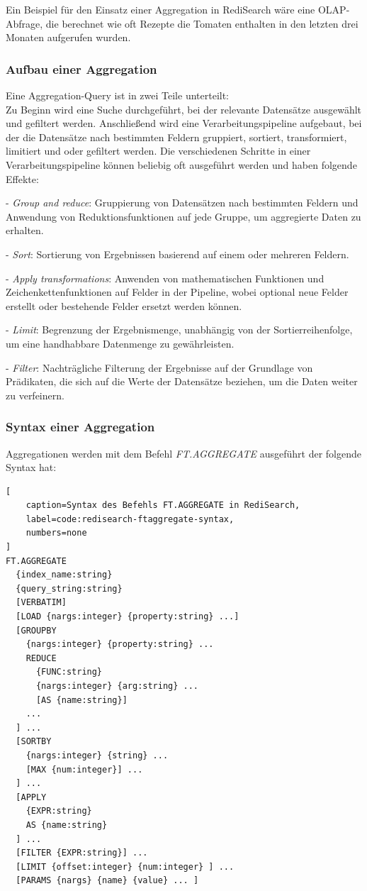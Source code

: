 Ein Beispiel für den Einsatz einer Aggregation in RediSearch wäre eine OLAP-Abfrage, die berechnet wie oft Rezepte die Tomaten enthalten in den letzten drei Monaten aufgerufen wurden.

\subsubsection{Aufbau einer Aggregation}
Eine Aggregation-Query ist in zwei Teile unterteilt:\\
Zu Beginn wird eine Suche durchgeführt, bei der relevante Datensätze ausgewählt und gefiltert werden.
Anschließend wird eine Verarbeitungspipeline aufgebaut, bei der die Datensätze nach bestimmten Feldern gruppiert, sortiert, transformiert, limitiert und oder gefiltert werden. Die verschiedenen Schritte in einer Verarbeitungspipeline können beliebig oft ausgeführt werden und haben folgende Effekte:

- \emph{Group and reduce}: Gruppierung von Datensätzen nach bestimmten Feldern und Anwendung von Reduktionsfunktionen auf jede Gruppe, um aggregierte Daten zu erhalten.
    
- \emph{Sort}: Sortierung von Ergebnissen basierend auf einem oder mehreren Feldern.
    
- \emph{Apply transformations}: Anwenden von mathematischen Funktionen und Zeichenkettenfunktionen auf Felder in der Pipeline, wobei optional neue Felder erstellt oder bestehende Felder ersetzt werden können.
    
- \emph{Limit}: Begrenzung der Ergebnismenge, unabhängig von der Sortierreihenfolge, um eine handhabbare Datenmenge zu gewährleisten.
    
- \emph{Filter}: Nachträgliche Filterung der Ergebnisse auf der Grundlage von Prädikaten, die sich auf die Werte der Datensätze beziehen, um die Daten weiter zu verfeinern.

\subsubsection{Syntax einer Aggregation}\label{sec:redisearch-aggregation-syntax}
Aggregationen werden mit dem Befehl \emph{FT.AGGREGATE} ausgeführt der folgende Syntax hat:
\begin{lstlisting}[
    caption=Syntax des Befehls FT.AGGREGATE in RediSearch,
    label=code:redisearch-ftaggregate-syntax,
    numbers=none
]
FT.AGGREGATE
  {index_name:string}
  {query_string:string}
  [VERBATIM]
  [LOAD {nargs:integer} {property:string} ...]
  [GROUPBY
    {nargs:integer} {property:string} ...
    REDUCE
      {FUNC:string}
      {nargs:integer} {arg:string} ...
      [AS {name:string}]
    ...
  ] ...
  [SORTBY
    {nargs:integer} {string} ...
    [MAX {num:integer}] ...
  ] ...
  [APPLY
    {EXPR:string}
    AS {name:string}
  ] ...
  [FILTER {EXPR:string}] ...
  [LIMIT {offset:integer} {num:integer} ] ...
  [PARAMS {nargs} {name} {value} ... ]
\end{lstlisting}


